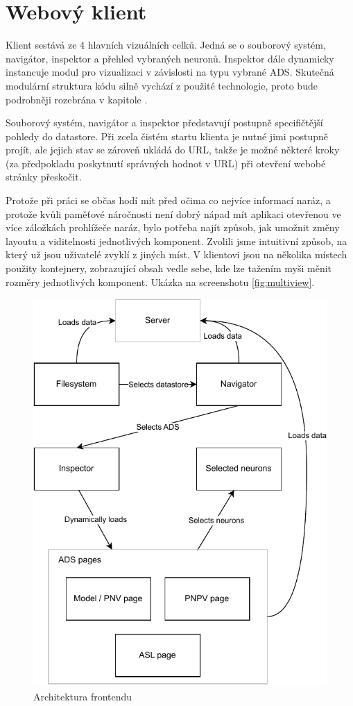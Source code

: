 \section{Webový klient}

Klient sestává ze 4 hlavních vizuálních celků. Jedná se o souborový systém, navigátor, inspektor a přehled vybraných neuronů. Inspektor dále dynamicky instancuje modul pro vizualizaci v závislosti na typu vybrané ADS. Skutečná modulární struktura kódu silně vychází z použité technologie, proto bude podrobněji rozebrána v kapitole .

Souborový systém, navigátor a inspektor představují postupně specifičtější pohledy do datastore. Při zcela čistém startu klienta je nutné jimi postupně projít, ale jejich stav se zároveň ukládá do URL, takže je možné některé kroky (za předpokladu poskytnutí správných hodnot v URL) při otevření webobé stránky přeskočit.

Protože při práci se občas hodí mít před očima co nejvíce informací naráz, a protože kvůli paměťové náročnosti není dobrý nápad mít aplikaci otevřenou ve více záložkách prohlížeče naráz, bylo potřeba najít způsob, jak umožnit změny layoutu a viditelnosti jednotlivých komponent. Zvolili jsme intuitivní způsob, na který už jsou uživatelé zvyklí z jiných míst. V klientovi jsou na několika místech použity kontejnery, zobrazující obsah vedle sebe, kde lze tažením myši měnit rozměry jednotlivých komponent. Ukázka na screenshotu \ref{fig:multiview}.

\begin{figure}
  \centering
  \includegraphics[width=.7\linewidth]{img/frontend_diagram.pdf}
  \caption{Architektura frontendu}
\end{figure}

